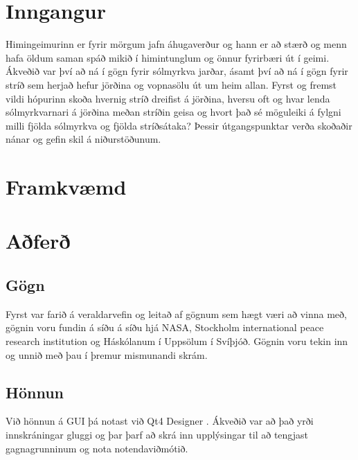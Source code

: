 \documentclass[12pt, git, final]{rureport}
\begin{document}
\maketitle  %


%
\section{Inngangur} %
Himingeimurinn er fyrir mörgum jafn áhugaverður og hann er að stærð og menn hafa öldum saman spáð mikið í himintunglum og önnur fyrirbæri út í geimi. Ákveðið var því að ná í gögn fyrir sólmyrkva jarðar, ásamt því að ná í gögn fyrir stríð  sem herjað hefur jörðina og vopnasölu út um heim allan. Fyrst og fremst vildi hópurinn skoða hvernig stríð dreifist á jörðina, hversu oft og hvar lenda sólmyrkvarnari á jörðina meðan stríðin geisa og hvort það sé möguleiki á fylgni milli fjölda sólmyrkva og fjölda stríðsátaka? Þessir útgangspunktar verða skoðaðir nánar og gefin skil á niðurstöðunum. 
\section{Framkvæmd}



\section{Aðferð}
\subsection{Gögn}
Fyrst var farið á veraldarvefin og leitað af gögnum sem hægt væri að vinna með, gögnin voru fundin á síðu á síðu hjá NASA\cite{Eclipse}, Stockholm international peace research institution\cite{weapon} og Háskólanum í Uppsölum í Svíþjóð\cite{conflict}. Gögnin voru tekin inn og unnið með þau í þremur mismunandi skrám.
\subsection{Hönnun}
Við hönnun á GUI þá notast  við Qt4 Designer \cite{qt4}. Ákveðið var að það yrði innskráningar gluggi og þar þarf að skrá inn upplýsingar til að tengjast gagnagrunninum og nota notendaviðmótið.
\end{document}
